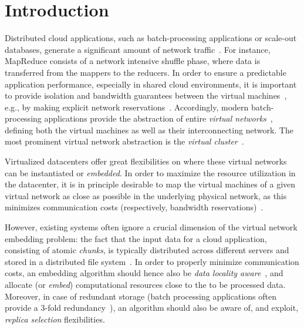 \documentclass[conference,10pt]{IEEEtran}
\begin{document}
\section{Introduction}


Distributed cloud applications, such as batch-processing applications or scale-out databases, generate a significant amount of network traffic~\cite{talk-about}.
For instance, MapReduce consists of a network intensive shuffle phase,
where data is transferred from the mappers to the reducers.
In order to ensure a predictable application performance, especially in shared cloud environments,
it is important to provide isolation and bandwidth guarantees between the virtual machines~\cite{amazonbw},
e.g., by making explicit network reservations~\cite{oktopus}.
Accordingly, modern batch-processing applications provide the abstraction of entire \emph{virtual networks}~\cite{talk-about},
defining both the virtual machines
as well as their interconnecting network. The most prominent virtual network abstraction is the \emph{virtual cluster}~\cite{oktopus,proteus}.

Virtualized datacenters
offer great flexibilities on where these virtual networks
can be instantiated or \emph{embedded}.
In order to maximize the resource utilization in the datacenter, it is in principle desirable to
map the virtual machines of a given virtual network as close as possible
in the underlying physical network, as this minimizes communication costs (respectively, bandwidth reservations)~\cite{oktopus,proteus}.

However, existing systems often ignore a crucial dimension of the virtual network embedding problem:
the fact that the input data for a cloud application, consisting of atomic
\emph{chunks}, is typically distributed across different servers and stored in
a distributed file system~\cite{scope,google-fs,hdfs}.
In order to properly minimize
communication costs, an embedding algorithm should hence also be \emph{data locality aware}~\cite{local-schedule-1,local-schedule-2,local-schedule-3},
and allocate (or \emph{embed}) computational resources close to the to be processed data.
Moreover, in case of redundant storage (batch processing
applications often provide a 3-fold redundancy~\cite{hdfs}), an algorithm should also be aware of, and exploit, \emph{replica selection}
flexibilities.
\end{document}
